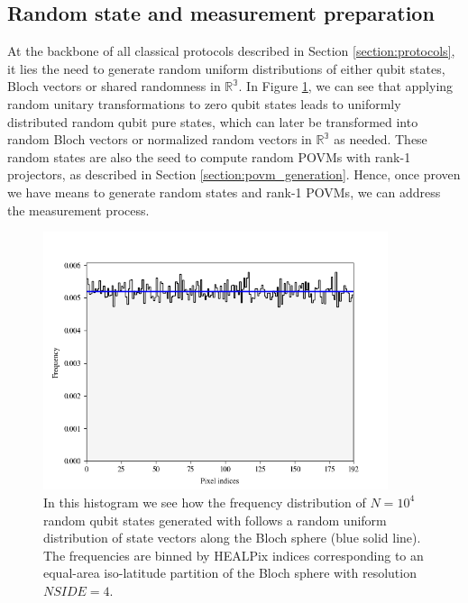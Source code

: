 \subsection{Random state and measurement preparation}
At the backbone of all classical protocols described in Section \ref{section:protocols}, it lies the need to generate random uniform distributions of either qubit states, Bloch vectors or shared randomness in $\mathbb{R^3}$. In Figure \ref{fig:results_random_states}, we can see that applying random unitary transformations to zero qubit states leads to uniformly distributed random qubit pure states, which can later be transformed into random Bloch vectors or normalized random vectors in $\mathbb{R^3}$ as needed. These random states are also the seed to compute random POVMs with rank-1 projectors, as described in Section \ref{section:povm_generation}. Hence, once proven we have means to generate random states and rank-1 POVMs, we can address the measurement process. 
\begin{figure}[h]
\centering
\includegraphics[width=0.9\textwidth]{images/random_bloch_healpix.png}
\caption{In this histogram we see how the frequency distribution of $N=10^4$ random qubit states generated with \cite{software2023} follows a random uniform distribution of state vectors along the Bloch sphere (blue solid line). The frequencies are binned by HEALPix indices corresponding to an equal-area iso-latitude partition of the Bloch sphere with resolution $\mathit{NSIDE}=4$.}
\label{fig:results_random_states}
\end{figure}

